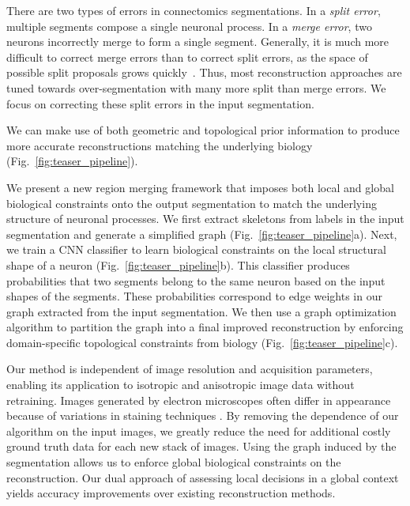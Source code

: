 There are two types of errors in connectomics segmentations.
In a \textit{split error}, multiple segments compose a single neuronal process. 
In a \textit{merge error}, two neurons incorrectly merge to form a single segment. 
Generally, it is much more difficult to correct merge errors than to correct split errors, as the space of possible split proposals grows quickly~\cite{parag2015properties}.
Thus, most reconstruction approaches are tuned towards over-segmentation with many more split than merge errors.
We focus on correcting these split errors in the input segmentation.


We can make use of both geometric and topological prior information to produce more accurate reconstructions matching the underlying biology (Fig.~\ref{fig:teaser_pipeline}).


We present a new region merging framework that imposes both local and global biological constraints onto the output segmentation to match the underlying structure of neuronal processes.
We first extract skeletons from labels in the input segmentation and generate a simplified graph (Fig.~\ref{fig:teaser_pipeline}a). 
Next, we train a CNN classifier to learn biological constraints on the local structural shape of a neuron (Fig.~\ref{fig:teaser_pipeline}b).
This classifier produces probabilities that two segments belong to the same neuron based on the input shapes of the segments.
These probabilities correspond to edge weights in our graph extracted from the input segmentation.
We then use a graph optimization algorithm to partition the graph into a final improved reconstruction by enforcing domain-specific topological constraints from biology (Fig.~\ref{fig:teaser_pipeline}c).


Our method is independent of image resolution and acquisition parameters, enabling its application to isotropic and anisotropic image data without retraining.
Images generated by electron microscopes often differ in appearance because of variations in staining techniques \cite{briggman2012volume}.
By removing the dependence of our algorithm on the input images, we greatly reduce the need for additional costly ground truth data for each new stack of images.
Using the graph induced by the segmentation allows us to enforce global biological constraints on the reconstruction. 
Our dual approach of assessing local decisions in a global context yields accuracy improvements over existing reconstruction methods.


